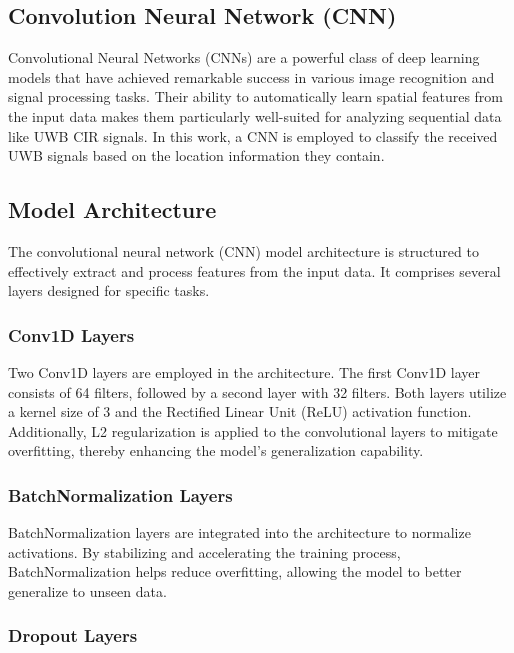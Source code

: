 \subsection{Convolution Neural Network (CNN)}\label{cnn}

Convolutional Neural Networks (CNNs) are a powerful class of deep learning models that have achieved remarkable success in various image recognition and signal processing tasks. Their ability to automatically learn spatial features from the input data makes them particularly well-suited for analyzing sequential data like UWB CIR signals. In this work, a CNN is employed to classify the received UWB signals based on the location information they contain.


\subsection{Model Architecture}

The convolutional neural network (CNN) model architecture is structured to effectively extract and process features from the input data. It comprises several layers designed for specific tasks.

\subsubsection{Conv1D Layers}

Two Conv1D layers are employed in the architecture. The first Conv1D layer consists of 64 filters, followed by a second layer with 32 filters. Both layers utilize a kernel size of 3 and the Rectified Linear Unit (ReLU) activation function. Additionally, L2 regularization is applied to the convolutional layers to mitigate overfitting, thereby enhancing the model's generalization capability.

\subsubsection{BatchNormalization Layers}

BatchNormalization layers are integrated into the architecture to normalize activations. By stabilizing and accelerating the training process, BatchNormalization helps reduce overfitting, allowing the model to better generalize to unseen data.

\subsubsection{Dropout Layers}

